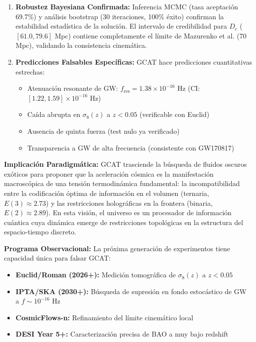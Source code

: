 \documentclass[12pt, a4paper]{article}
\theoremstyle{plain}
\theoremstyle{definition}
\begin{document}
\begin{enumerate}
    \item \textbf{Robustez Bayesiana Confirmada:} Inferencia MCMC (tasa aceptación 69.7\%) y análisis bootstrap (30 iteraciones, 100\% éxito) confirman la estabilidad estadística de la solución. El intervalo de credibilidad para $D_c$ ($[61.0, 79.6]$ Mpc) contiene completamente el límite de Mazurenko et al. (70 Mpc), validando la consistencia cinemática.
    
    \item \textbf{Predicciones Falsables Específicas:} GCAT hace predicciones cuantitativas estrechas:
    \begin{itemize}
        \item Atenuación resonante de GW: $f_{\text{res}} = 1.38 \times 10^{-16}$ Hz (CI: $[1.22, 1.59] \times 10^{-16}$ Hz)
        \item Caída abrupta en $\sigma_8(z)$ a $z < 0.05$ (verificable con Euclid)
        \item Ausencia de quinta fuerza (test nulo ya verificado)
        \item Transparencia a GW de alta frecuencia (consistente con GW170817)
    \end{itemize}
\end{enumerate}

\textbf{Implicación Paradigmática:} GCAT trasciende la búsqueda de fluidos oscuros exóticos para proponer que la aceleración cósmica es la manifestación macroscópica de una tensión termodinámica fundamental: la incompatibilidad entre la codificación óptima de información en el volumen (ternaria, $E(3) \approx 2.73$) y las restricciones holográficas en la frontera (binaria, $E(2) \approx 2.89$). En esta visión, el universo es un procesador de información cuántica cuya dinámica emerge de restricciones topológicas en la estructura del espacio-tiempo discreto.

\textbf{Programa Observacional:} La próxima generación de experimentos tiene capacidad única para falsar GCAT:
\begin{itemize}
    \item \textbf{Euclid/Roman (2026+):} Medición tomográfica de $\sigma_8(z)$ a $z < 0.05$
    \item \textbf{IPTA/SKA (2030+):} Búsqueda de supresión en fondo estocástico de GW a $f \sim 10^{-16}$ Hz
    \item \textbf{CosmicFlows-n:} Refinamiento del límite cinemático local
    \item \textbf{DESI Year 5+:} Caracterización precisa de BAO a muy bajo redshift
\end{itemize}
\end{document}
